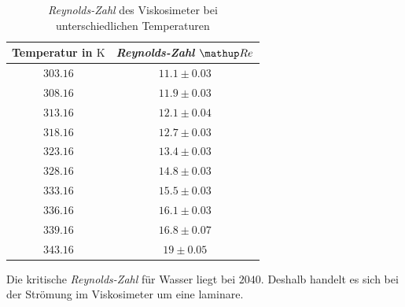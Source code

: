 \begin{table}
\centering
\begin{tabular} {cc}
  \toprule
  Temperatur in $\si{\kelvin}$ & \emph{Reynolds-Zahl} $\map{Re}$ \\
  \midrule 
  $\num{303.16}$ & $\num{11.1}\pm \num{0.03}$ \\
  $\num{308.16}$ & $\num{11.9}\pm \num{0.03}$ \\
  $\num{313.16}$ & $\num{12.1}\pm \num{0.04}$ \\ 
  $\num{318.16}$ & $\num{12.7}\pm \num{0.03}$ \\
  $\num{323.16}$ & $\num{13.4}\pm \num{0.03}$ \\ 
  $\num{328.16}$ & $\num{14.8}\pm \num{0.03}$ \\ 
  $\num{333.16}$ & $\num{15.5}\pm \num{0.03}$ \\ 
  $\num{336.16}$ & $\num{16.1}\pm \num{0.03}$ \\
  $\num{339.16}$ & $\num{16.8}\pm \num{0.07}$ \\
  $\num{343.16}$ & $\num{19}\pm \num{0.05}$ \\
\bottomrule
\end{tabular}
\caption{\emph{Reynolds-Zahl} des Viskosimeter bei unterschiedlichen Temperaturen}
\label{tab:rey_visko}
\end{table}
Die kritische \emph{Reynolds-Zahl} für Wasser liegt bei $2040$\cite{rey}.
Deshalb handelt es sich bei der Strömung im Viskosimeter um eine laminare.
